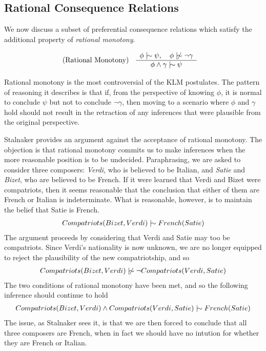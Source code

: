 \subsection{Rational Consequence Relations}
\label{subseciton:rational-consequence-relations}

We now discuss a subset of preferential consequence relations which satisfy the additional property of \textit{rational
monotony}.

\begin{align}
	\inferLeft{Rational Monotony}{\phi \twiddle \psi, \quad \phi \ntwiddle \neg \gamma}{\phi \land \gamma \twiddle \psi}
\end{align}

Rational monotony is the most controversial of the KLM postulates. The pattern of reasoning it describes is that if, from
the perspective of knowing $\phi$, it is normal to conclude $\psi$ but not to conclude $\neg \gamma$, then moving to a scenario
where $\phi$ and $\gamma$ hold should not result in the retraction of any inferences that were plausible from the original
perspective.

Stalnaker \cite{Stalnaker1994,sep-logic-nonmonotonic-Stanford} provides an argument against the acceptance of rational monotony.
The objection is that rational monotony commits us to make inferences when the more reasonable position is to be
undecided. Paraphrasing, we are asked to consider three composers: \textit{Verdi}, who is believed to be Italian, and
\textit{Satie} and \textit{Bizet}, who are believed to be French. If it were learned that Verdi and Bizet were
compatriots, then it seems reasonable that the conclusion that either of them are French or Italian is indeterminate.
What is reasonable, however, is to maintain the belief that Satie is French.
\begin{align}
	Compatriots(Bizet, Verdi) \twiddle French(Satie)
\end{align}
The argument proceeds by considering that Verdi and Satie may too be compatriots. Since Verdi's nationality is now
unknown, we are no longer equipped to reject the plausibility of the new compatriotship, and so
\begin{align}
	Compatriots(Bizet, Verdi) \ntwiddle \neg Compatriots(Verdi,Satie)
\end{align}
The two conditions of rational monotony have been met, and so the following inference should continue to hold
\begin{align}
	Compatriots(Bizet, Verdi) \land Compatriots(Verdi,Satie) \twiddle French(Satie)
\end{align}
The issue, as Stalnaker sees it, is that we are then forced to conclude that all three composers are French, when in
fact we should have no intution for whether they are French or Italian.

